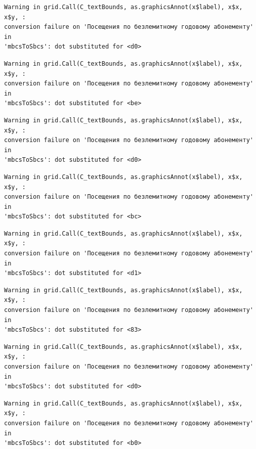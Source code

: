 \documentclass[
  letterpaper,
  DIV=11,
  numbers=noendperiod]{scrartcl}
\begin{document}
\begin{verbatim}
Warning in grid.Call(C_textBounds, as.graphicsAnnot(x$label), x$x, x$y, :
conversion failure on 'Посещения по безлемитному годовому абонементу' in
'mbcsToSbcs': dot substituted for <d0>
\end{verbatim}

\begin{verbatim}
Warning in grid.Call(C_textBounds, as.graphicsAnnot(x$label), x$x, x$y, :
conversion failure on 'Посещения по безлемитному годовому абонементу' in
'mbcsToSbcs': dot substituted for <be>
\end{verbatim}

\begin{verbatim}
Warning in grid.Call(C_textBounds, as.graphicsAnnot(x$label), x$x, x$y, :
conversion failure on 'Посещения по безлемитному годовому абонементу' in
'mbcsToSbcs': dot substituted for <d0>
\end{verbatim}

\begin{verbatim}
Warning in grid.Call(C_textBounds, as.graphicsAnnot(x$label), x$x, x$y, :
conversion failure on 'Посещения по безлемитному годовому абонементу' in
'mbcsToSbcs': dot substituted for <bc>
\end{verbatim}

\begin{verbatim}
Warning in grid.Call(C_textBounds, as.graphicsAnnot(x$label), x$x, x$y, :
conversion failure on 'Посещения по безлемитному годовому абонементу' in
'mbcsToSbcs': dot substituted for <d1>
\end{verbatim}

\begin{verbatim}
Warning in grid.Call(C_textBounds, as.graphicsAnnot(x$label), x$x, x$y, :
conversion failure on 'Посещения по безлемитному годовому абонементу' in
'mbcsToSbcs': dot substituted for <83>
\end{verbatim}

\begin{verbatim}
Warning in grid.Call(C_textBounds, as.graphicsAnnot(x$label), x$x, x$y, :
conversion failure on 'Посещения по безлемитному годовому абонементу' in
'mbcsToSbcs': dot substituted for <d0>
\end{verbatim}

\begin{verbatim}
Warning in grid.Call(C_textBounds, as.graphicsAnnot(x$label), x$x, x$y, :
conversion failure on 'Посещения по безлемитному годовому абонементу' in
'mbcsToSbcs': dot substituted for <b0>
\end{verbatim}
\end{document}
